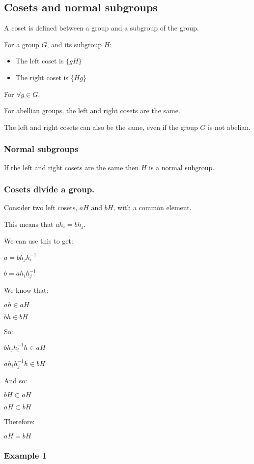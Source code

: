 
\subsection{Cosets and normal subgroups}


A coset is defined between a group and a subgroup of the group.

For a group \(G\), and its subgroup \(H\):

\begin{itemize}
\item The left coset is \(\{gH\}\)
\item The right coset is \(\{Hg\}\)
\end{itemize}

For \(\forall g\in G\).

For abellian groups, the left and right cosets are the same.

The left and right cosets can also be the same, even if the group \(G\) is not abelian.

\subsubsection{Normal subgroups}

If the left and right cosets are the same then \(H\) is a normal subgroup.

\subsubsection{Cosets divide a group.}

Consider two left cosets, \(aH\) and \(bH\), with a common element.

This means that \(ah_i=bh_j\).

We can use this to get:

\(a=bh_jh_i^{-1}\)

\(b=ah_ih_j^{-1}\)

We know that:

\(ah\in aH\)

\(bh\in bH\)

So:

\(bh_jh_i^{-1}h\in aH\)

\(ah_ih_j^{-1}h\in bH\)

And so:

\(bH\subset aH\)

\(aH\subset bH\)

Therefore:

\(aH=bH\)

\subsubsection{Example 1}

